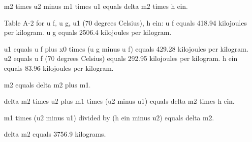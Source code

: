 m2 times u2 minus m1 times u1 equals delta m2 times h ein.  

Table A-2 for u f, u g, u1 (70 degrees Celsius), h ein:  
u f equals 418.94 kilojoules per kilogram.  
u g equals 2506.4 kilojoules per kilogram.  

u1 equals u f plus x0 times (u g minus u f) equals 429.28 kilojoules per kilogram.  
u2 equals u f (70 degrees Celsius) equals 292.95 kilojoules per kilogram.  
h ein equals 83.96 kilojoules per kilogram.  

m2 equals delta m2 plus m1.  

delta m2 times u2 plus m1 times (u2 minus u1) equals delta m2 times h ein.  

m1 times (u2 minus u1) divided by (h ein minus u2) equals delta m2.  

delta m2 equals 3756.9 kilograms.